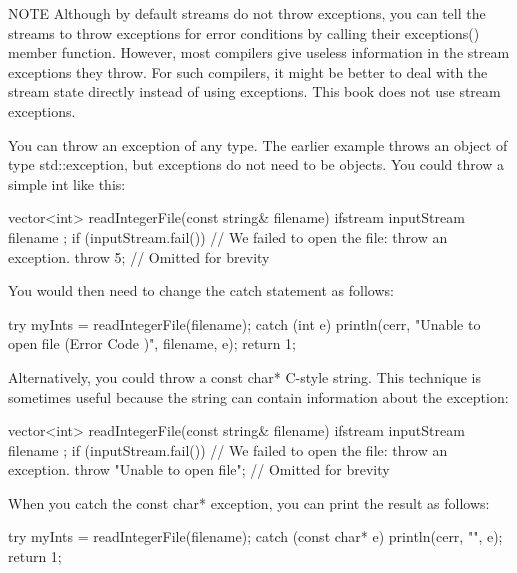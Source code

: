 \begin{myNotic}{NOTE}
Although by default streams do not throw exceptions, you can tell the streams to throw exceptions for error conditions by calling their exceptions() member function. However, most compilers give useless information in the stream exceptions they throw. For such compilers, it might be better to deal with the stream state directly instead of using exceptions. This book does not use stream exceptions.
\end{myNotic}


You can throw an exception of any type. The earlier example throws an object of type std::exception, but exceptions do not need to be objects. You could throw a simple int like this:

\begin{cpp}
vector<int> readIntegerFile(const string& filename)
{
    ifstream inputStream { filename };
    if (inputStream.fail()) {
        // We failed to open the file: throw an exception.
        throw 5;
    }
    // Omitted for brevity
}
\end{cpp}

You would then need to change the catch statement as follows:

\begin{cpp}
try {
    myInts = readIntegerFile(filename);
} catch (int e) {
    println(cerr, "Unable to open file {} (Error Code {})", filename, e);
    return 1;
}
\end{cpp}

Alternatively, you could throw a const char* C-style string. This technique is sometimes useful because the string can contain information about the exception:

\begin{cpp}
vector<int> readIntegerFile(const string& filename)
{
    ifstream inputStream { filename };
    if (inputStream.fail()) {
        // We failed to open the file: throw an exception.
        throw "Unable to open file";
    }
    // Omitted for brevity
}
\end{cpp}

When you catch the const char* exception, you can print the result as follows:

\begin{cpp}
try {
    myInts = readIntegerFile(filename);
} catch (const char* e) {
    println(cerr, "{}", e);
    return 1;
}
\end{cpp}

